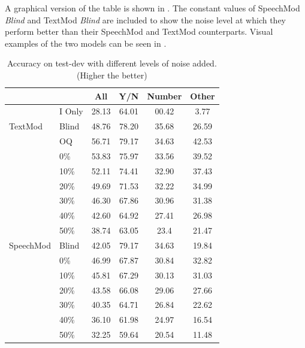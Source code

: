 \documentclass[letterpaper]{article} %
\begin{document}
A graphical version of the table is shown in . The constant values of SpeechMod \textit{Blind} and TextMod \textit{Blind} are included to show the noise level at which they perform better than their SpeechMod and TextMod counterparts. Visual examples of the two models can be seen in .


\begin{table}[t]
\centering
\caption{Accuracy on test-dev with different levels of noise added. (Higher the better)}
\label{table:vqa test-dev}
\begin{tabular}{ll|cccc}
          &                     & All    & Y/N    & Number & Other \\ \hline
          & I Only \cite{VQA}   & 28.13  & 64.01  & 00.42  & 3.77  \\ \hline
TextMod   & Blind               & 48.76  & 78.20  & 35.68  & 26.59 \\
          & OQ                  & 56.71  & 79.17  & 34.63  & 42.53 \\
          & 0\%                 & 53.83  & 75.97  & 33.56  & 39.52 \\
          & 10\%                & 52.11  & 74.41  & 32.90  & 37.43 \\
          & 20\%                & 49.69  & 71.53  & 32.22  & 34.99 \\
          & 30\%                & 46.30  & 67.86  & 30.96  & 31.38 \\
          & 40\%                & 42.60  & 64.92  & 27.41  & 26.98 \\
          & 50\%                & 38.74  & 63.05  & 23.4   & 21.47 \\ \hline
SpeechMod & Blind               & 42.05  & 79.17  & 34.63  & 19.84 \\ 
          & 0\%                 & 46.99  & 67.87  & 30.84  & 32.82 \\
          & 10\%                & 45.81  & 67.29  & 30.13  & 31.03 \\
          & 20\%                & 43.58  & 66.08  & 29.06  & 27.66 \\
          & 30\%                & 40.35  & 64.71  & 26.84  & 22.62 \\
          & 40\%                & 36.10  & 61.98  & 24.97  & 16.54 \\
          & 50\%                & 32.25  & 59.64  & 20.54  & 11.48 
\end{tabular}
\end{table}
\end{document}
